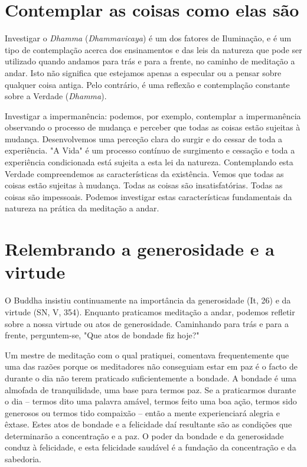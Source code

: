\section{Contemplar as coisas como elas são}

Investigar o \emph{Dhamma} (\emph{Dhammavicaya}) é um dos fatores de
Iluminação, e é um tipo de contemplação acerca dos ensinamentos e das
leis da natureza que pode ser utilizado quando andamos para trás e para
a frente, no caminho de meditação a andar. Isto não significa que
estejamos apenas a especular ou a pensar sobre qualquer coisa antiga.
Pelo contrário, é uma reflexão e contemplação constante sobre a Verdade
(\emph{Dhamma}).

Investigar a impermanência: podemos, por exemplo, contemplar a
impermanência observando o processo de mudança e perceber que todas as
coisas estão sujeitas à mudança. Desenvolvemos uma perceção clara do
surgir e do cessar de toda a experiência. "A Vida" é um processo
contínuo de surgimento e cessação e toda a experiência condicionada está
sujeita a esta lei da natureza. Contemplando esta Verdade compreendemos
as características da existência. Vemos que todas as coisas estão
sujeitas à mudança. Todas as coisas são insatisfatórias. Todas as coisas
são impessoais. Podemos investigar estas características fundamentais da
natureza na prática da meditação a andar.

\section{Relembrando a generosidade e a virtude}

O Buddha insistiu continuamente na importância da generosidade (It, 26)
e da virtude (SN, V, 354). Enquanto praticamos meditação a andar,
podemos refletir sobre a nossa virtude ou atos de generosidade.
Caminhando para trás e para a frente, perguntem-se, "Que atos de bondade
fiz hoje?"

Um mestre de meditação com o qual pratiquei, comentava frequentemente
que uma das razões porque os meditadores não conseguiam estar em paz é o
facto de durante o dia não terem praticado suficientemente a bondade. A
bondade é uma almofada de tranquilidade, uma base para termos paz. Se a
praticarmos durante o dia -- termos dito uma palavra amável, termos
feito uma boa ação, termos sido generosos ou termos tido compaixão --
então a mente experienciará alegria e êxtase. Estes atos de bondade e a
felicidade daí resultante são as condições que determinarão a
concentração e a paz. O poder da bondade e da generosidade conduz à
felicidade, e esta felicidade saudável é a fundação da concentração e da
sabedoria.

